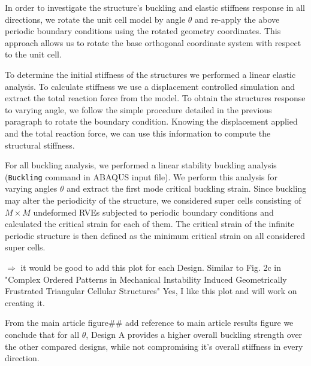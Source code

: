 \documentclass[10pt,twoside]{fernandes_supp}
\newcommand{\KB}[1]{\noindent\color{blue}$\Longrightarrow$ #1\normalcolor}
\newcommand{\mf}[1]{\colorbox{blue!10}{\color{color3}#1}}
\begin{document}
In order to investigate the structure's buckling and elastic stiffness response in all directions, we rotate the unit cell model by angle $\theta$ and re-apply the above periodic boundary conditions using the rotated geometry coordinates. This approach allows us to rotate the base orthogonal coordinate system with respect to the unit cell. 

To determine the initial stiffness of the structures we performed a linear elastic analysis. To calculate stiffness we use a displacement controlled simulation and extract the total reaction force from the model. To obtain the structures response to varying angle, we follow the simple procedure detailed in the previous paragraph to rotate the boundary condition. Knowing the displacement applied and the total reaction force, we can use this information to compute the structural stiffness.

For all buckling analysis, we performed a linear stability buckling analysis ({\tt *Buckling} command in ABAQUS input file). We perform this analysis for varying angles $\theta$ and extract the first mode critical buckling strain. Since buckling may alter the periodicity of the
structure, we considered super cells consisting of $M \times M$
undeformed RVEs subjected to periodic boundary
conditions and calculated the critical strain for each of
them. The critical strain of the infinite periodic structure is
then defined as the minimum critical strain on all considered
super cells. 


\KB{it would be good to add this plot for each Design. Similar to Fig. 2c in "Complex Ordered Patterns in Mechanical Instability Induced Geometrically
Frustrated Triangular Cellular Structures"} \mf{Yes, I like this plot and will work on creating it.}

From the main article figure\#\# \mf{add reference to main article results figure} we conclude that for all $\theta$, Design A provides a higher overall buckling strength over the other compared designs, while not compromising it's overall stiffness in every direction.
\end{document}
